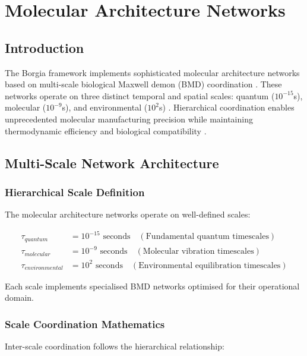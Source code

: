 \documentclass[12pt,a4paper]{article}
\begin{document}
\section{Molecular Architecture Networks}

\subsection{Introduction}

The Borgia framework implements sophisticated molecular architecture networks based on multi-scale biological Maxwell demon (BMD) coordination \cite{mizraji2007biological}. These networks operate on three distinct temporal and spatial scales: quantum ($10^{-15}$s), molecular ($10^{-9}$s), and environmental ($10^{2}$s) \cite{ball2011physics,tegmark2000importance}. Hierarchical coordination enables unprecedented molecular manufacturing precision while maintaining thermodynamic efficiency and biological compatibility \cite{vedral2011living}.

\subsection{Multi-Scale Network Architecture}

\subsubsection{Hierarchical Scale Definition}

The molecular architecture networks operate on well-defined scales:

\begin{align}
\tau_{quantum} &= 10^{-15} \text{ seconds} \quad (\text{Fundamental quantum timescales}) \\
\tau_{molecular} &= 10^{-9} \text{ seconds} \quad (\text{Molecular vibration timescales}) \\
\tau_{environmental} &= 10^{2} \text{ seconds} \quad (\text{Environmental equilibration timescales})
\end{align}

Each scale implements specialised BMD networks optimised for their operational domain.

\subsubsection{Scale Coordination Mathematics}

Inter-scale coordination follows the hierarchical relationship:
\end{document}
